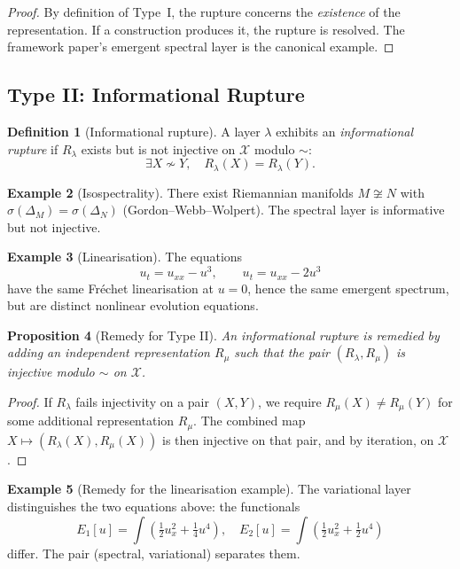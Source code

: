 \documentclass[11pt,a4paper]{article}
\theoremstyle{definition}
\newtheorem{definition}{Definition}[section]
\newtheorem{example}[definition]{Example}
\theoremstyle{plain}
\newtheorem{proposition}[definition]{Proposition}
\newcommand{\Xcal}{\mathcal{X}}
\newcommand{\simadm}{\sim}
\newcommand{\spec}{\sigma}
\begin{document}
\begin{proof}
By definition of Type~I, the rupture concerns the \emph{existence}
of the representation. If a construction produces it, the rupture
is resolved. The framework paper's emergent spectral layer is the
canonical example.
\end{proof}

\subsection{Type II: Informational Rupture}

\begin{definition}[Informational rupture]\label{def:rupture-II}
A layer $\lambda$ exhibits an \emph{informational rupture} if
$R_\lambda$ exists but is not injective on $\Xcal$ modulo $\simadm$:
\[
  \exists X \not\simadm Y, \quad R_\lambda(X) = R_\lambda(Y).
\]
\end{definition}

\begin{example}[Isospectrality]
There exist Riemannian manifolds $M \not\cong N$ with
$\spec(\Delta_M) = \spec(\Delta_N)$ (Gordon--Webb--Wolpert). The
spectral layer is informative but not injective.
\end{example}

\begin{example}[Linearisation]
The equations
\[
  u_t = u_{xx} - u^3, \qquad u_t = u_{xx} - 2 u^3
\]
have the same Fr\'echet linearisation at $u = 0$, hence the same
emergent spectrum, but are distinct nonlinear evolution equations.
\end{example}

\begin{proposition}[Remedy for Type II]\label{prop:remedy-II}
An informational rupture is remedied by adding an independent
representation $R_\mu$ such that the pair $(R_\lambda, R_\mu)$ is
injective modulo $\simadm$ on $\Xcal$.
\end{proposition}

\begin{proof}
If $R_\lambda$ fails injectivity on a pair $(X, Y)$, we require
$R_\mu(X) \neq R_\mu(Y)$ for some additional representation
$R_\mu$. The combined map $X \mapsto (R_\lambda(X), R_\mu(X))$ is
then injective on that pair, and by iteration, on $\Xcal$.
\end{proof}

\begin{example}[Remedy for the linearisation example]
The variational layer distinguishes the two equations above: the
functionals
\[
  E_1[u] = \int \left( \tfrac{1}{2} u_x^2 + \tfrac{1}{4} u^4 \right),
  \quad
  E_2[u] = \int \left( \tfrac{1}{2} u_x^2 + \tfrac{1}{2} u^4 \right)
\]
differ. The pair (spectral, variational) separates them.
\end{example}
\end{document}
